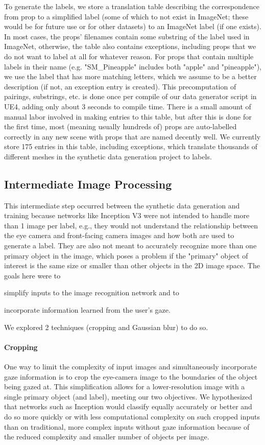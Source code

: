 To generate the labels, we store a translation table describing the correspondence from prop to a simplified label (some of which to not exist in ImageNet; these would be for future use or for other datasets) to an ImageNet label (if one exists). In most cases, the props' filenames contain some substring of the label used in ImageNet, otherwise, the table also contains exceptions, including props that we do not want to label at all for whatever reason. For props that contain multiple labels in their name (e.g. "SM\_Pineapple" includes both "apple" and "pineapple"), we use the label that has more matching letters, which we assume to be a better description (if not, an exception entry is created). This precomputation of pairings, substrings, etc. is done once per compile of our data generator script in UE4, adding only about 3 seconds to compile time. There is a small amount of manual labor involved in making entries to this table, but after this is done for the first time, most (meaning usually hundreds of) props are auto-labelled correctly in any new scene with props that are named decently well. We currently store 175 entries in this table, including exceptions, which translate thousands of different meshes in the synthetic data generation project to labels.

\subsection{Intermediate Image Processing}

This intermediate step occurred between the synthetic data generation and training
because networks like Inception V3 were not intended to handle more than 1 image
per label, e.g., they would not understand the relationship between the eye
camera and front-facing camera images and how both are used to generate a label. They are also not meant to accurately recognize more than one primary object in the image, which poses a problem if the "primary" object of interest is the same size or smaller than other objects in the 2D image space.
The goals here were to
\begin{inlist}
\item simplify inputs to the image recognition network and to
\item incorporate information learned from the user's gaze.
\end{inlist}
We explored 2 techniques (cropping and Gaussian blur) to do so.
\paragraph{Cropping}
One way to limit the complexity of input images and simultaneously incorporate
gaze information is to crop the eye-camera image to the boundaries of the object
being gazed at. This simplification allows for a lower-resolution image with a
single primary object (and label), meeting our two objectives. We hypothesized
that networks such as Inception would classify equally accurately or better and
do so more quickly or with less computational complexity on such cropped inputs
than on traditional, more complex inputs without gaze information because of the
reduced complexity and smaller number of objects per image.

